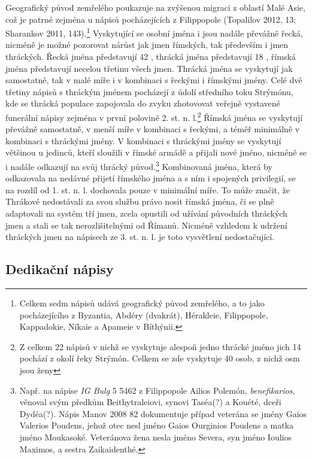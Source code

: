 Geografický původ zemřelého poukazuje na zvýšenou migraci z oblastí Malé Asie, což je patrné zejména u nápisů pocházejících z Filippopole (Topalilov 2012, 13; Sharankov 2011, 143).\footnote{Celkem sedm nápisů udává geografický původ zemřelého, a to jako pocházejícího z Byzantia, Abdéry (dvakrát), Hérakleie, Filippopole, Kappadokie, Níkaie a Apameie v Bíthýnii.} Vyskytující se osobní jména i jsou nadále převážně řecká, nicméně je možné pozorovat nárůst jak jmen římských, tak především i jmen thráckých. Řecká jména představují 42 , thrácká jména představují 18 , římská jména představují necelou třetinu všech jmen. Thrácká jména se vyskytují jak samostatně, tak v malé míře i v kombinaci s řeckými i římskými jmény. Celé dvě třetiny nápisů s thráckým jménem pocházejí z údolí středního toku Strýmónu, kde se thrácká populace zapojovala do zvyku zhotovovat veřejně vystavené funerální nápisy zejména v první polovině 2. st. n. l.\footnote{Z celkem 22 nápisů v nichž se vyskytuje alespoň jedno thrácké jméno jich 14 pochází z okolí řeky Strýmón. Celkem se zde vyskytuje 40 osob, z nichž osm jsou ženy} Římská jména se vyskytují převážně samostatně, v menší míře v kombinaci s řeckými, a téměř minimálně v kombinaci s thráckými jmény. V kombinaci s thráckými jmény se vyskytují většinou u jedinců, kteří sloužili v římské armádě a přijali nové jméno, nicméně se i nadále odkazují na svůj thrácký původ.\footnote{Např. na nápise {\em IG Bulg} 5 5462 z Filippopole Ailios Polemón, {\em benefikarios}, věnoval svým předkům Beithytraleiovi, synovi Taséa(?) a Kouété, dceři Dydéa(?). Nápis Manov 2008 82 dokumentuje případ veterána se jmény Gaios Valerios Poudens, jehož otec nesl jméno Gaios Ourginios Poudens a matka jméno Moukasoké. Veteránova žena nesla jméno Severa, syn jméno Ioulios Maximos, a sestra Zaikaidenthé.} Kombinovaná jména, která by odkazovala na nedávné přijetí římského jména a s ním i spojených privilegií, se na rozdíl od 1. st. n. l. dochovala pouze v minimální míře. To může značit, že Thrákové nedostávali za svou službu právo nosit římská jména, či se plně adaptovali na systém tří jmen, zcela opustili od užívání původních thráckých jmen a stali se tak nerozlišitelnými od Římanů. Nicméně vzhledem k udržení thráckých jmen na nápisech ze 3. st. n. l. je toto vysvětlení nedostačující.

\subsection[dedikační-nápisy-13]{Dedikační nápisy}

